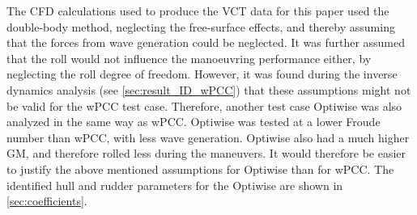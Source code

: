 \noindent The CFD calculations used to produce the VCT data for this paper used the double-body method, neglecting the free-surface effects, and thereby assuming that the forces from wave generation could be neglected. It was further assumed that the roll would not influence the manoeuvring performance either, by neglecting the roll degree of freedom.
However, it was found during the inverse dynamics analysis (see \autoref{sec:result_ID_wPCC}) that these assumptions might not be valid for the wPCC test case. 
Therefore, another test case Optiwise was also analyzed in the same way as wPCC. Optiwise was tested at a lower Froude number than wPCC, with less wave generation. Optiwise also had a much higher GM, and therefore rolled less during the maneuvers. It would therefore be easier to justify the above mentioned assumptions for Optiwise than for wPCC. 
The identified hull and rudder parameters for the Optiwise are shown in \autoref{sec:coefficients}.